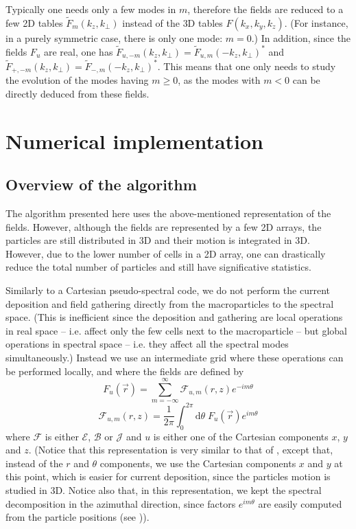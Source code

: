 \documentclass[a4paper]{article}   	%
\newcommand{\TInteg}[1]{\int_{0}^{2\pi} \!\!\!\!\! \mathrm{d}#1}
\begin{document}
Typically one needs only a few modes in $m$, therefore the fields are
reduced to a few 2D tables $\tilde{F}_m(k_z,k_\perp )$ instead of the
3D tables $\hat{F}(k_x,k_y,k_z)$. (For instance, in a purely symmetric
case, there is only one mode: $m=0$.) In addition, since the fields
$F_u$ are real, one has $\tilde{F}_{u,-m}(k_z, k_\perp) =
\tilde{F}_{u,m}(-k_z, k_\perp)^{*}$ and $\tilde{F}_{+,-m}(k_z, k_\perp) =
\tilde{F}_{-,m}(-k_z, k_\perp)^{*}$. This means that one only needs to study the evolution of the modes having $m\geq 0$, as the modes with $m<0$ can
be directly deduced from these fields.

\section{Numerical implementation}

\subsection{Overview of the algorithm}

The algorithm presented here uses the above-mentioned representation
of the fields. However, although the fields are represented by a few
2D arrays, the particles are still distributed in 3D and their motion
is integrated in 3D. However, due to the
lower number of cells in a 2D array, one can drastically reduce the
total number of particles and still have significative statistics.

Similarly to a Cartesian pseudo-spectral code, we do not perform the
current deposition and field gathering directly from the
macroparticles to the spectral space. (This is inefficient since the
deposition and gathering are local operations in real space -- i.e. affect
only the few cells next to the macroparticle -- but global operations
in spectral space -- i.e. they affect all the spectral modes
simultaneously.) Instead we use an intermediate grid where these
operations can be performed locally, and where the fields
are defined by
\begin{equation} 
\label{eq:IntermBwTrans}
F_u(\vec{r}) = \sum_{m=-\infty}^{\infty} \mathcal{F}_{u,m}(r,z)
e^{-im\theta} 
\end{equation}
\begin{equation}
\label{eq:IntermFwTrans}
\mathcal{F}_{u,m}(r,z) = \frac{1}{2\pi} \TInteg{\theta} \;
F_u(\vec{r})e^{im\theta}
\end{equation}
where $\mathcal{F}$ is either $\mathcal{E}$, $\mathcal{B}$ or
$\mathcal{J}$ and $u$ is either one of the Cartesian components $x$,
$y$ and $z$. (Notice that this representation is very similar to that
of \cite{Lifschitz, Davidson}, except that, instead of the $r$ and
$\theta$ components, we use the Cartesian components $x$ and $y$ at
this point, which is easier for current deposition, since the
particles motion is studied in 3D. Notice also that, in this
representation, we kept the spectral decomposition in the azimuthal
direction, since factors $e^{im\theta}$ are easily computed from the
particle positions (see \cite{Lifschitz})).
\end{document}
